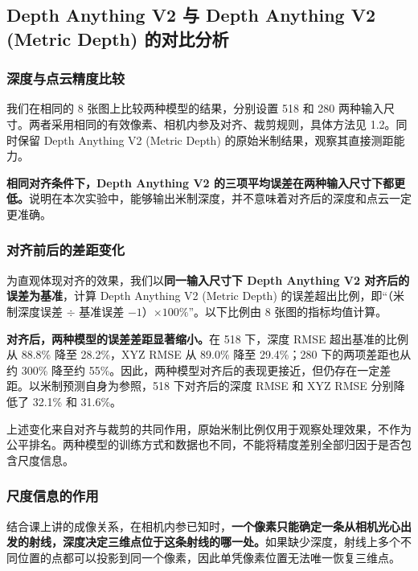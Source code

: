\clearpage
\subsection{Depth Anything V2 与 Depth Anything V2 (Metric Depth) 的对比分析}

\subsubsection{深度与点云精度比较}

我们在相同的 8 张图上比较两种模型的结果，分别设置 518 和 280 两种输入尺寸。两者采用相同的有效像素、相机内参及对齐、裁剪规则，具体方法见 1.2。同时保留 Depth Anything V2 (Metric Depth) 的原始米制结果，观察其直接测距能力。



\textbf{相同对齐条件下，Depth Anything V2 的三项平均误差在两种输入尺寸下都更低。}说明在本次实验中，能够输出米制深度，并不意味着对齐后的深度和点云一定更准确。

\subsubsection{对齐前后的差距变化}

为直观体现对齐的效果，我们以\textbf{同一输入尺寸下 Depth Anything V2 对齐后的误差为基准}，计算 Depth Anything V2 (Metric Depth) 的误差超出比例，即“（米制深度误差 $\div$ 基准误差 $-1$）$\times100\%$”。以下比例由 8 张图的指标均值计算。



\textbf{对齐后，两种模型的误差差距显著缩小。}在 518 下，深度 RMSE 超出基准的比例从 88.8\% 降至 28.2\%，XYZ RMSE 从 89.0\% 降至 29.4\%；280 下的两项差距也从约 300\% 降至约 55\%。因此，两种模型对齐后的表现更接近，但仍存在一定差距。以米制预测自身为参照，518 下对齐后的深度 RMSE 和 XYZ RMSE 分别降低了 32.1\% 和 31.6\%。

上述变化来自对齐与裁剪的共同作用，原始米制比例仅用于观察处理效果，不作为公平排名。两种模型的训练方式和数据也不同，不能将精度差别全部归因于是否包含尺度信息。

\subsubsection{尺度信息的作用}

结合课上讲的成像关系，在相机内参已知时，\textbf{一个像素只能确定一条从相机光心出发的射线，深度决定三维点位于这条射线的哪一处。}如果缺少深度，射线上多个不同位置的点都可以投影到同一个像素，因此单凭像素位置无法唯一恢复三维点。

